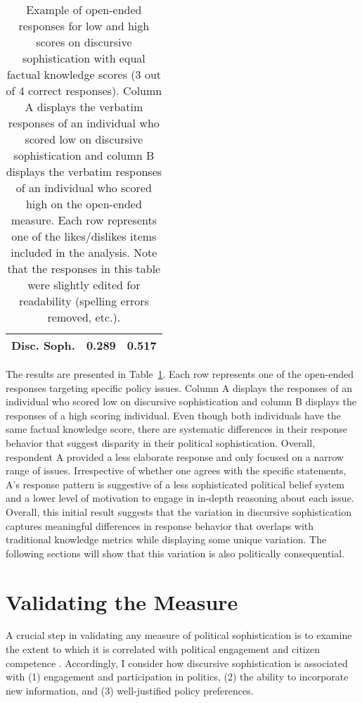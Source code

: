 \begin{table}[ht]
\begin{tabular}{l|p{6.8cm}|p{5.8cm}}
					\\\midrule
Disc. Soph. 		& 0.289
					& 0.517 
					\\\bottomrule
\end{tabular}
\caption[Example of open-ended responses for low and high scores on discursive sophistication]{Example of open-ended responses for low and high scores on discursive sophistication with equal factual knowledge scores (3 out of 4 correct responses). Column A displays the verbatim responses of an individual who scored low on discursive sophistication and column B displays the verbatim responses of an individual who scored high on the open-ended measure. Each row represents one of the likes/dislikes items included in the analysis. Note that the responses in this table were slightly edited for readability (spelling errors removed, etc.).}\label{tab:ex1}
\end{table}

The results are presented in Table~\ref{tab:ex1}. Each row represents one of the open-ended responses targeting specific policy issues. Column A displays the responses of an individual who scored low on discursive sophistication and column B displays the responses of a high scoring individual. Even though both individuals have the same factual knowledge score, there are systematic differences in their response behavior that suggest disparity in their political sophistication. Overall, respondent A provided a less elaborate response and only focused on a narrow range of issues. Irrespective of whether one agrees with the specific statements, A's response pattern is suggestive of a less sophisticated political belief system and a lower level of motivation to engage in in-depth reasoning about each issue. Overall, this initial result suggests that the variation in discursive sophistication captures meaningful differences in response behavior that overlaps with traditional knowledge metrics while displaying some unique variation. The following sections will show that this variation is also politically consequential.




\section*{Validating the Measure}

A crucial step in validating any measure of political sophistication is to examine the extent to which it is correlated with political engagement and citizen competence \citep{lupia2006elitism,lupia2015uninformed}. Accordingly, I consider how discursive sophistication is associated with (1) engagement and participation in politics, (2) the ability to incorporate new information, and (3) well-justified policy preferences.


